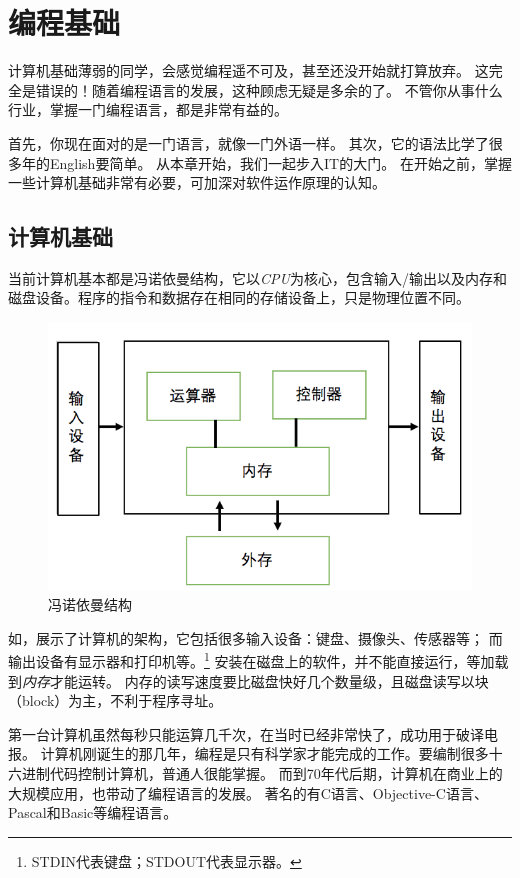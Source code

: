 \chapter{编程基础}
\label{chap:java_datatype}

计算机基础薄弱的同学，会感觉编程遥不可及，甚至还没开始就打算放弃。
这完全是错误的！随着编程语言的发展，这种顾虑无疑是多余的了。
不管你从事什么行业，掌握一门编程语言，都是非常有益的。

首先，你现在面对的是一门语言，就像一门外语一样。
其次，它的语法比学了很多年的English要简单。
从本章开始，我们一起步入IT的大门。
在开始之前，掌握一些计算机基础非常有必要，可加深对软件运作原理的认知。

\section{计算机基础}
当前计算机基本都是冯诺依曼结构，它以\emph{CPU}为核心，包含输入/输出以及内存和磁盘设备。程序的指令和数据存在相同的存储设备上，只是物理位置不同。

\begin{figure}[!htb]
\centerline{\includegraphics[width=.3\figwidth]{images/von_neumann.png}}
\label{fig:part1_von_neumann}
\caption{冯诺依曼结构}
\end{figure}

\noindent
如，展示了计算机的架构，它包括很多输入设备：键盘、摄像头、传感器等；
而输出设备有显示器和打印机等。\footnote{STDIN代表键盘；STDOUT代表显示器。}
安装在磁盘上的软件，并不能直接运行，等加载到\emph{内存}才能运转。
内存的读写速度要比磁盘快好几个数量级，且磁盘读写以块（block）为主，不利于程序寻址。

第一台计算机虽然每秒只能运算几千次，在当时已经非常快了，成功用于破译电报。
计算机刚诞生的那几年，编程是只有科学家才能完成的工作。要编制很多十六进制代码控制计算机，普通人很能掌握。
而到70年代后期，计算机在商业上的大规模应用，也带动了编程语言的发展。
著名的有C语言、Objective-C语言、Pascal和Basic等编程语言。

